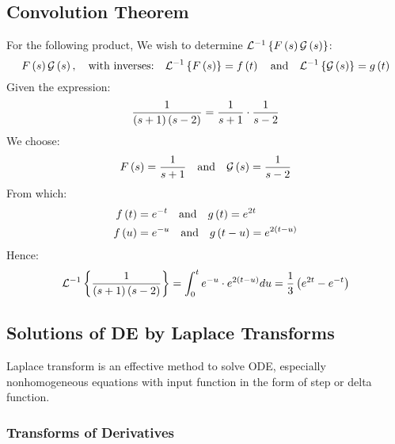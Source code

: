 \subsection{Convolution Theorem}
For the following product, We wish to determine $\mathcal{L}^{-1}\left\{F\left(s\right)\mathcal{G}\left(s\right)\right\}$:
\begin{equation}
    F\left(s\right)\mathcal{G}\left(s\right),\quad\text{with inverses:}\quad\mathcal{L}^{-1}\left\{F\left(s\right)\right\}=f\left(t\right)\quad\text{and}\quad\mathcal{L}^{-1}\left\{\mathcal{G}\left(s\right)\right\}=g\left(t\right)
\end{equation}
Given the expression:
\begin{equation*}
    \frac{1}{\left(s+1\right)\left(s-2\right)}=\frac{1}{s+1}\cdot\frac{1}{s-2}
\end{equation*}
We choose:
\begin{align*}
    F\left(s\right)=\frac{1}{s+1}\quad\text{and}\quad\mathcal{G}\left(s\right)=\frac{1}{s-2}
\end{align*}
From which:
\begin{align*}
    f\left(t\right)&=e^{-t}\quad\text{and}\quad g\left(t\right)=e^{2t}\\
    f\left(u\right)&=e^{-u}\quad\text{and}\quad g\left(t-u\right)=e^{2\left(t-u\right)}
\end{align*}
Hence:
\begin{equation*}
    \mathcal{L}^{-1}\left\{\frac{1}{\left(s+1\right)\left(s-2\right)}\right\}=\int_{0}^{t}e^{-u}\cdot e^{2\left(t-u\right)}du=\frac{1}{3}\left(e^{2t}-e^{-t}\right)
\end{equation*}
\subsection{Solutions of DE by Laplace Transforms}
Laplace transform is an effective method to solve ODE, especially nonhomogeneous equations with input function in the form of step or delta function.
\subsubsection{Transforms of Derivatives}
